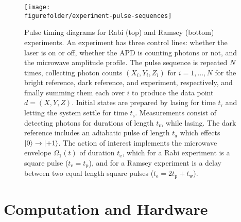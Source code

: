 \documentclass[aps,nofootinbib,twocolumn,superscriptaddress]{revtex4}
\newcommand{\figurefolder}{../fig}
\newcommand{\data}{d}
\newcommand{\te}{t_\text{e}}
\newcommand{\tp}{t_\text{p}}
\newcommand{\tw}{t_\text{w}}
\newcommand{\tm}{t_\text{m}}
\begin{document}
\begin{figure}[t]
    \texttt{[image: \\figurefolder/experiment-pulse-sequences]}
    \caption{Pulse timing diagrams for Rabi (top) and Ramsey 
        (bottom) experiments. An experiment has three control lines:
        whether the laser is on or off, whether the APD is counting 
        photons or not, and the microwave amplitude profile.
        The pulse sequence is repeated $N$ times, collecting
        photon counts $(X_i,Y_i,Z_i)$ for $i=1,...,N$ for the bright reference,
        dark reference, and experiment, respectively, and finally summing them
        each over $i$ to produce the data point $\data=(X,Y,Z)$.
        Initial states are prepared by lasing for time $t_\text{r}$
        and letting the system settle for time $t_\text{s}$.
        Measurements consist of detecting photons for 
        durations of length $\tm$ while lasing.
        The dark reference includes an adiabatic pulse of length 
        $t_\text{a}$ which effects $\ket{0}\rightarrow\ket{+1}$.
        The action of interest implements the microwave envelope 
        $\Omega_1(t)$ of duration $\te$, 
        which for a Rabi experiment is a square pulse ($\te=\tp$),
        and for a Ramsey experiment is a delay between two equal
        length square pulses ($\te=2 \tp+\tw$).
        }
    \label{fig:experiment-pulse-sequences}
\end{figure}

\section{Computation and Hardware}
\label{sec:computation-and-hardware}
\end{document}
